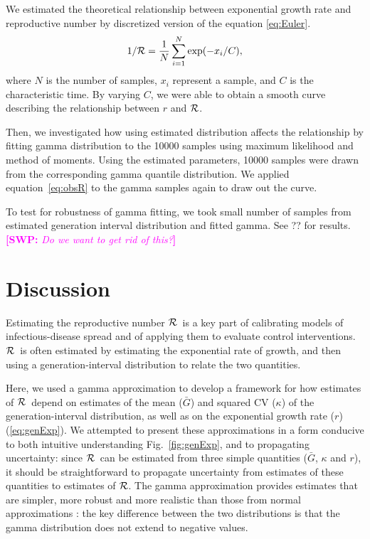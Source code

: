 \documentclass[12pt,]{article}
\newcommand{\RR}{\ensuremath{{\cal R}}}
\newcommand{\eref}[1]{(\ref{eq:#1})}
\newcommand{\fref}[1]{Fig.~\ref{fig:#1}}
\newcommand{\comment}[3]{\textcolor{#1}{\textbf{[#2: }\textit{#3}\textbf{]}}}
\newcommand{\swp}[1]{\comment{magenta}{SWP}{#1}}
\begin{document}
We estimated the theoretical relationship between exponential growth rate and reproductive number by discretized version of the equation \ref{eq:Euler}.
\begin{equation}
1/\RR = \frac{1}{N} \sum_{i=1}^{N} \exp(-x_i/C),
\label{eq:obsR}
\end{equation}
where $N$ is the number of samples, $x_i$ represent a sample, and $C$ is the characteristic time. By varying $C$, we were able to obtain a smooth curve describing the relationship between $r$ and $\RR$.

Then, we investigated how using estimated distribution affects the relationship by fitting gamma distribution to the 10000 samples using maximum likelihood and method of moments. Using the estimated parameters, 10000 samples were drawn from the corresponding gamma quantile distribution. We applied equation~\ref{eq:obsR} to the gamma samples again to draw out the curve.

To test for robustness of gamma fitting, we took small number of samples from estimated generation interval distribution and fitted gamma. See ?? for results. \swp{Do we want to get rid of this?}

\section{Discussion}

Estimating the reproductive number \RR\ is a key part of calibrating models of infectious-disease spread and of applying them to evaluate control interventions. \RR\ is often estimated by estimating the exponential rate of growth, and then using a generation-interval distribution to relate the two quantities. 

Here, we used a gamma approximation \cite{NishCast09} to develop a framework for how estimates of \RR\ depend on estimates of the mean ($\bar G$) and squared CV ($\kappa$) of the generation-interval distribution, as well as on the exponential growth rate ($r$) \eref{genExp}. 
We attempted to present these approximations in a form conducive to both intuitive understanding \fref{genExp}, and to propagating uncertainty: since \RR\ can be estimated from three simple quantities ($\bar G$, $\kappa$ and $r$), it should be straightforward to propagate uncertainty from estimates of these quantities to estimates of \RR.
The gamma approximation provides estimates that are simpler, more robust and more realistic than those from normal approximations \cite{WallLips07}:
the key difference between the two distributions is that the gamma distribution does not extend to negative values.
\end{document}

